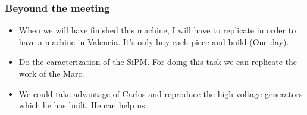 \documentclass{beamer}
\begin{document}
\begin{frame}
\frametitle{Beyound the meeting}

\begin{itemize}

\item{} When we will have finished this machine, I will have to replicate in order to have a machine in Valencia. It's only buy each piece and build (One day).

\item{} Do the caracterization of the SiPM. For doing this task we can replicate the work of the Marc.

\item{} We could take advantage of Carlos and reproduce the high voltage generators which he has built. He can help us.

\end{itemize}

\end{frame}




\end{document}

